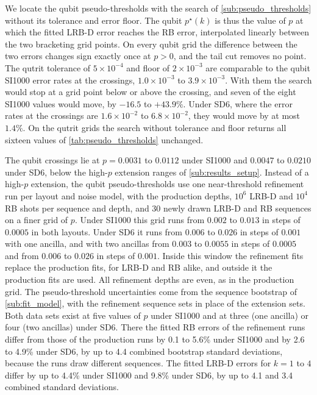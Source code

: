 We locate the qubit pseudo-thresholds with the search of \autoref{sub:pseudo_thresholds} without its tolerance and error floor. The qubit $p^\star(k)$ is thus the value of $p$ at which the fitted LRB-D error reaches the RB error, interpolated linearly between the two bracketing grid points. On every qubit grid the difference between the two errors changes sign exactly once at $p > 0$, and the tail cut removes no point. The qutrit tolerance of $5\times10^{-4}$ and floor of $2\times10^{-3}$ are comparable to the qubit SI1000 error rates at the crossings, $1.0\times10^{-3}$ to $3.9\times10^{-3}$. With them the search would stop at a grid point below or above the crossing, and seven of the eight SI1000 values would move, by $-16.5$ to $+43.9\%$. Under SD6, where the error rates at the crossings are $1.6\times10^{-2}$ to $6.8\times10^{-2}$, they would move by at most $1.4\%$. On the qutrit grids the search without tolerance and floor returns all sixteen values of \autoref{tab:pseudo_thresholds} unchanged.

The qubit crossings lie at $p = 0.0031$ to $0.0112$ under SI1000 and $0.0047$ to $0.0210$ under SD6, below the high-$p$ extension ranges of \autoref{sub:results_setup}. Instead of a high-$p$ extension, the qubit pseudo-thresholds use one near-threshold refinement run per layout and noise model, with the production depths, $10^6$ LRB-D and $10^4$ RB shots per sequence and depth, and 30 newly drawn LRB-D and RB sequences on a finer grid of $p$. Under SI1000 this grid runs from $0.002$ to $0.013$ in steps of $0.0005$ in both layouts. Under SD6 it runs from $0.006$ to $0.026$ in steps of $0.001$ with one ancilla, and with two ancillas from $0.003$ to $0.0055$ in steps of $0.0005$ and from $0.006$ to $0.026$ in steps of $0.001$. Inside this window the refinement fits replace the production fits, for LRB-D and RB alike, and outside it the production fits are used. All refinement depths are even, as in the production grid. The pseudo-threshold uncertainties come from the sequence bootstrap of \autoref{sub:fit_model}, with the refinement sequence sets in place of the extension sets. Both data sets exist at five values of $p$ under SI1000 and at three (one ancilla) or four (two ancillas) under SD6. There the fitted RB errors of the refinement runs differ from those of the production runs by 0.1 to 5.6\% under SI1000 and by 2.6 to 4.9\% under SD6, by up to 4.4 combined bootstrap standard deviations, because the runs draw different sequences. The fitted LRB-D errors for $k = 1$ to $4$ differ by up to 4.4\% under SI1000 and 9.8\% under SD6, by up to 4.1 and 3.4 combined standard deviations.
